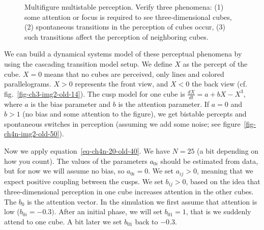 \documentclass[
  a4paper,
  DIV=11,
  numbers=noendperiod,
  oneside]{scrreprt}
\begin{document}
\begin{figure}


\caption{\label{fig-ch4n-img18-old-66}Multifigure multistable
perception. Verify three phenomena: (1) some attention or focus is
required to see three-dimensional cubes, (2) spontaneous transitions in
the perception of cubes occur, (3) such transitions affect the
perception of neighboring cubes.}

\end{figure}%

We can build a dynamical systems model of these perceptual phenomena by
using the cascading transition model setup. We define \(X\) as the
percept of the cube. \(X = 0\) means that no cubes are perceived, only
lines and colored parallelograms. \(X > 0\) represents the front view,
and \(X < 0\) the back view (cf. fig.~\ref{fig-ch3-img2-old-14}). The
cusp model for one cube is \(\frac{dX}{dt} = {a + bX - X}^{3}\), where
\(a\) is the bias parameter and \(b\) is the attention parameter. If
\(a = 0\) and \(b > 1\) (no bias and some attention to the figure), we
get bistable percepts and spontaneous switches in perception (assuming
we add some noise; see figure~\ref{fig-ch4n-img2-old-50}).

Now we apply equation~\ref{eq-ch4n-20-old-40}. We have \(N = 25\) (a bit
depending on how you count). The values of the parameters \(a_{0i}\)
should be estimated from data, but for now we will assume no bias, so
\(a_{0i} = 0\). We set \(a_{ij} > 0\), meaning that we expect positive
coupling between the cusps. We set \(b_{ij} > 0\), based on the idea
that three-dimensional perception in one cube increases attention in the
other cubes. The \(b_{0}\) is the attention vector. In the simulation we
first assume that attention is low (\(b_{0i} = -0.3)\). After an initial
phase, we will set \(b_{01} = 1\), that is we suddenly attend to one
cube. A bit later we set \(b_{01}\) back to \(-0.3\).
\end{document}
